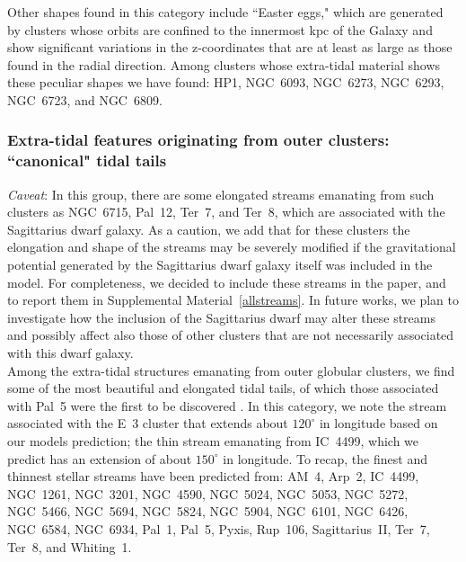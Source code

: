             Other shapes found in this category include ``Easter eggs," which are generated by clusters whose orbits are confined to the innermost kpc of the Galaxy and show significant variations in the z-coordinates that are at least as large as those found in the radial direction. Among clusters whose extra-tidal material shows these peculiar shapes we have found: HP1, NGC~6093, NGC~6273, NGC~6293, NGC~6723, and NGC~6809.

        \subsubsection{Extra-tidal features originating from outer clusters: ``canonical" tidal tails}

            \textit{Caveat}: In this group, there are some elongated streams emanating from such clusters as NGC~6715, Pal~12, Ter~7, and Ter~8, which are  associated with the Sagittarius dwarf galaxy. As a caution, we add that for these clusters the elongation and shape of the streams may be severely modified if the gravitational potential generated by the Sagittarius dwarf galaxy itself was included in the model. For completeness, we decided to include these streams in the paper, and to report them in Supplemental Material~\ref{allstreams}. In future works, we plan to investigate how the inclusion of the Sagittarius dwarf may alter these streams and possibly affect also those of other clusters that are not necessarily associated with this dwarf galaxy.\\

            Among the extra-tidal structures emanating from outer globular clusters, we find some of the most beautiful and elongated tidal tails, of which those associated with Pal~5 were the first to be discovered \citep{2001ApJ...548L.165O}.  In this category, we note the stream associated with the E~3 cluster that extends about  $120^\circ$  in longitude based on our models prediction; the thin stream emanating from IC~4499, which we predict has an extension of about $150^\circ$ in longitude.  To recap, the finest and thinnest stellar streams have been predicted from: AM~4, Arp~2, IC~4499, NGC~1261, NGC~3201, NGC~4590, NGC~5024, NGC~5053, NGC~5272, NGC~5466, NGC~5694, NGC~5824, NGC~5904, NGC~6101, NGC~6426, NGC~6584, NGC~6934, Pal~1, Pal~5, Pyxis, Rup~106, Sagittarius~II, Ter~7, Ter~8, and Whiting~1.

